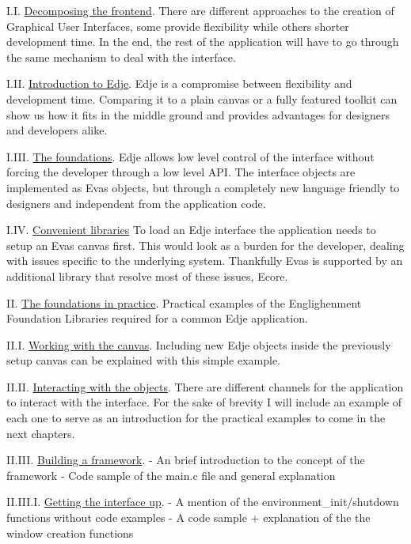 \documentclass[12pt,a4paper,english]{book}
\begin{document}
I.I. \href{\#decomposing-the-frontend}{Decomposing the frontend}.
There are different approaches to the creation of Graphical User Interfaces,
some provide flexibility while others shorter development time. In the end, the
rest of the application will have to go through the same mechanism to deal
with the interface.

I.II. \href{\#introduction-to-edje}{Introduction to Edje}.
Edje is a compromise between flexibility and development time. Comparing it to
a plain canvas or a fully featured toolkit can show us how it fits in the
middle ground and provides advantages for designers and developers alike.

I.III. \href{\#the-foundations}{The foundations}.
Edje allows low level control of the interface without forcing the developer
through a low level API. The interface objects are implemented as Evas objects,
but through a completely new language friendly to designers and independent
from the application code.

I.IV. \href{\#convenient-libraries}{Convenient libraries}
To load an Edje interface the application needs to setup an Evas canvas first.
This would look as a burden for the developer, dealing with issues specific to
the underlying system. Thankfully Evas is supported by an additional library
that resolve most of these issues, Ecore.

II. \href{\#the-foundations-in-practice}{The foundations in practice}.
Practical examples of the Englighenment Foundation Libraries required for a
common Edje application.

II.I. \href{\#working-with-the-canvas}{Working with the canvas}.
Including new Edje objects inside the previously setup canvas can be explained
with this simple example.

II.II. \href{\#interacting-with-the-objects}{Interacting with the objects}.
There are different channels for the application to interact with the
interface. For the sake of brevity I will include an example of each one to
serve as an introduction for the practical examples to come in the next
chapters.

II.III. \href{\#building-a-framework}{Building a framework}.
- An brief introduction to the concept of the framework
- Code sample of the main.c file and general explanation

II.III.I. \href{\#getting-the-interface-up}{Getting the interface up}.
- A mention of the environment{\_}init/shutdown functions without code examples
- A code sample + explanation of the the window creation functions
\end{document}
